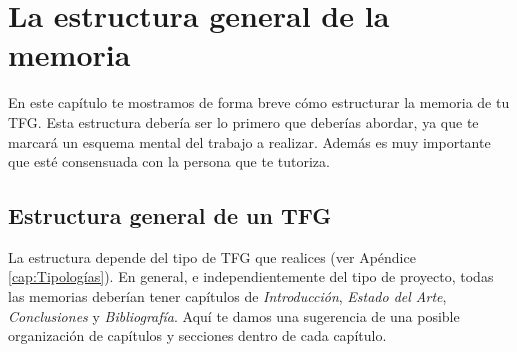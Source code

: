 \chapter{La estructura general de la memoria}
\label{cap:EstructuraMemoria}

En este capítulo te mostramos de forma breve cómo estructurar la memoria de tu TFG. Esta estructura debería ser lo primero que deberías abordar, ya que te marcará un esquema mental del trabajo a realizar. Además es muy importante que esté consensuada con la persona que te tutoriza. 

\section{Estructura general de un TFG}

La estructura depende del tipo de TFG que realices (ver Apéndice \ref{cap:Tipologías}). En general, e independientemente del tipo de proyecto, todas las memorias deberían tener capítulos de \textit{Introducción}, \textit{Estado del Arte}, \textit{Conclusiones} y \textit{Bibliografía}. Aquí te damos una sugerencia de una posible organización de capítulos y secciones dentro de cada capítulo. 

